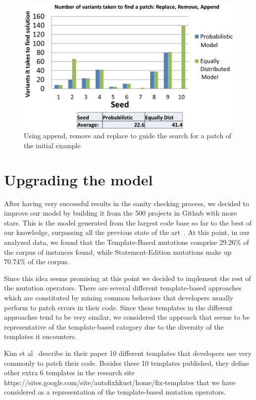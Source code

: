 \documentclass[conference]{IEEEtran}
\begin{document}
\begin{figure}[!h]
  \centering
    \includegraphics[scale=0.25]{sanity4}
  \caption{Using append, remove and replace to guide the search for a patch of 
the initial example}
  \label{fig:resultsARR}
\end{figure}

\section{Upgrading the model}
After having very successful results in the sanity checking process, we decided 
to improve our model by building it from the 500 projects in Github with more 
stars. This is the model generated from the largest code base so far to the best 
of our knowledge, surpassing all the previous state of the 
art~\cite{long15,Soto15,zhong15,matias15}. At this point, in our analyzed data, we found that the Template-Based mutations comprise 29.26\% of the corpus of instances found, while Statement-Edition mutations make up 70.74\% of the corpus.

Since this idea seems promising at this point we decided to implement the rest 
of the mutation operators. There are several different template-based approaches 
\cite{kim2013,fan15,long15} which are constituted by mining common behaviors 
that developers usually perform to patch errors in their code. Since these 
templates in the different approaches tend to be very similar, we considered the 
approach that seems to be representative of the template-based category due to 
the diversity of the templates it encounters. 

Kim et al~\cite{kim2013} describe in their paper 10 different templates that 
developers use very commonly to patch their code. Besides these 10 templates 
published, they define other extra 6 templates in the research site 
https://sites.google.com/site/autofixhkust/home/fix-templates that we have 
considered as a representation of the template-based mutation operators.
\end{document}
